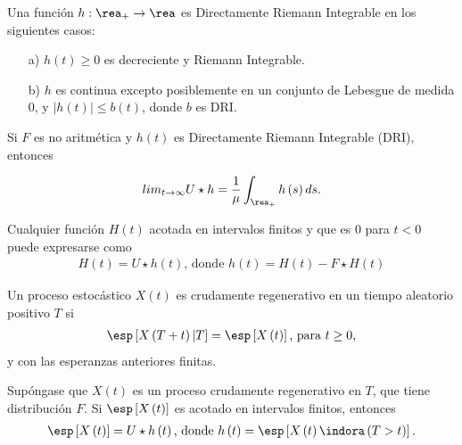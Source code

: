\begin{Note} Una funci\'on $h:\rea_{+}\rightarrow\rea$ es Directamente Riemann Integrable en los siguientes casos:
\begin{itemize}
\item[a)] $h\left(t\right)\geq0$ es decreciente y Riemann Integrable.
\item[b)] $h$ es continua excepto posiblemente en un conjunto de Lebesgue de medida 0, y $|h\left(t\right)|\leq b\left(t\right)$, donde $b$ es DRI.
\end{itemize}
\end{Note}

\begin{Teo}
Si $F$ es no aritm\'etica y $h\left(t\right)$ es Directamente Riemann Integrable (DRI), entonces

\begin{eqnarray*}
lim_{t\rightarrow\infty}U\star h=\frac{1}{\mu}\int_{\rea_{+}}h\left(s\right)ds.
\end{eqnarray*}
\end{Teo}

\begin{Prop}
Cualquier funci\'on $H\left(t\right)$ acotada en intervalos finitos y que es 0 para $t<0$ puede expresarse como
\begin{eqnarray*}
H\left(t\right)=U\star h\left(t\right)\textrm{,  donde }h\left(t\right)=H\left(t\right)-F\star H\left(t\right)
\end{eqnarray*}
\end{Prop}

\begin{Def}
Un proceso estoc\'astico $X\left(t\right)$ es crudamente regenerativo en un tiempo aleatorio positivo $T$ si
\begin{eqnarray*}
\esp\left[X\left(T+t\right)|T\right]=\esp\left[X\left(t\right)\right]\textrm{, para }t\geq0,\end{eqnarray*}
y con las esperanzas anteriores finitas.
\end{Def}

\begin{Prop}
Sup\'ongase que $X\left(t\right)$ es un proceso crudamente regenerativo en $T$, que tiene distribuci\'on $F$. Si $\esp\left[X\left(t\right)\right]$ es acotado en intervalos finitos, entonces
\begin{eqnarray*}
\esp\left[X\left(t\right)\right]=U\star h\left(t\right)\textrm{,  donde }h\left(t\right)=\esp\left[X\left(t\right)\indora\left(T>t\right)\right].
\end{eqnarray*}
\end{Prop}

